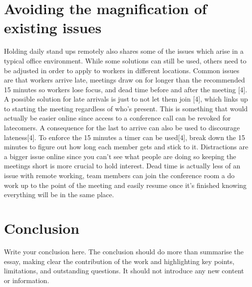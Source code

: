 \documentclass{scrartcl}
\begin{document}
\section{Avoiding the magnification of existing issues}

Holding daily stand ups remotely also shares some of the issues which arise in a typical office environment. While some solutions can still be used, others need to be adjusted in order to apply to workers in different locations. Common issues are that workers arrive late, meetings draw on for longer than the recommended 15 minutes so workers lose focus, and dead time before and after the meeting [4].
A possible solution for late arrivals is just to not let them join [4], which links up to starting the meeting regardless of who’s present. This is something that would actually be easier online since access to a conference call can be revoked for latecomers. A consequence for the last to arrive can also be used to discourage lateness[4]. To enforce the 15 minutes a timer can be used[4], break down the 15 minutes to figure out how long each member gets and stick to it. Distractions are a bigger issue online since you can’t see what people are doing so keeping the meetings short is more crucial to hold interest. Dead time is actually less of an issue with remote working, team members can join the conference room a do work up to the point of the meeting and easily resume once it’s finished knowing everything will be in the same place.


\section{Conclusion}

Write your conclusion here. The conclusion should do more than summarise the essay, making clear the contribution of the work and highlighting key points, limitations, and outstanding questions. It should not introduce any new content or information.



\end{document}
